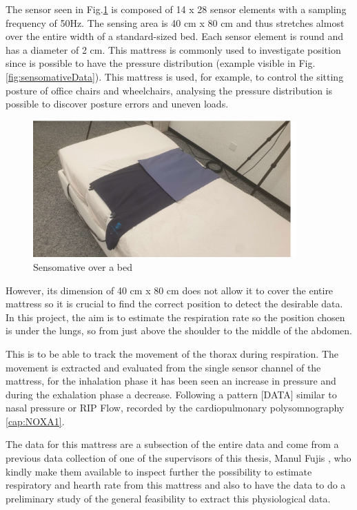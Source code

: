 The sensor seen in Fig.\ref{fig:sensomativeBed} is composed of 14 x 28 sensor elements with a sampling frequency of 50Hz. 
The sensing area is 40 cm x 80 cm and thus stretches almost over the entire width of a standard-sized bed. Each sensor element is round and has a diameter of 2 cm.
This mattress is commonly used to investigate position since is possible to have the pressure distribution (example visible in Fig.\ref{fig:sensomativeData}). This mattress is used, for example, to control the sitting posture of office chairs and wheelchairs, analysing the pressure distribution is possible to discover posture errors and uneven loads.\\

\vspace*{0.5cm}
\begin{figure}[H]
    \centering
    \includegraphics[width=0.9\textwidth]{img/sensomative.png}
    \caption{Sensomative over a bed}
    \label{fig:sensomativeBed}
\end{figure}
\vspace*{0.5cm}

However, its dimension of 40 cm x 80 cm does not allow it to cover the entire mattress so it is crucial to find the correct position to detect the desirable data. In this project, the aim is to estimate the respiration rate so the position chosen is under the lungs, so from just above the shoulder to the middle of the abdomen.

This is to be able to track the movement of the thorax during respiration. The movement is extracted and evaluated from the single sensor channel of the mattress, for the inhalation phase it has been seen an increase in pressure and during the exhalation phase a decrease. Following a pattern [DATA] similar to nasal pressure or RIP Flow, recorded by the cardiopulmonary polysomnography \ref{cap:NOXA1}. 

The data for this mattress are a subsection of the entire data and come from a previous data collection of one of the supervisors of this thesis, Manul Fujis \cite{ManuelZurich}, who kindly make them available to inspect further the possibility to estimate respiratory and hearth rate from this mattress and also to have the data to do a preliminary study of the general feasibility to extract this physiological data. 



